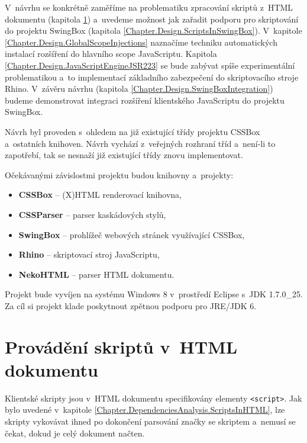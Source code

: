 V~návrhu se konkrétně zaměříme na problematiku zpracování skriptů z~HTML dokumentu (kapitola \ref{Chapter.Design.ScriptsInHTML}) a~uvedeme možnost jak zařadit podporu pro skriptování do projektu SwingBox (kapitola \ref{Chapter.Design.ScriptsInSwingBox}). V~kapitole \ref{Chapter.Design.GlobalScopeInjections} naznačíme techniku automatických instalací rozšíření do hlavního scope  JavaScriptu. Kapitola \ref{Chapter.Design.JavaScriptEngineJSR223} se bude zabývat spíše experimentální problematikou a~to implementací základního zabezpečení do skriptovacího stroje Rhino. V~závěru návrhu (kapitola \ref{Chapter.Design.SwingBoxIntegration}) budeme demonstrovat integraci rozšíření klientského JavaScriptu do projektu SwingBox.

Návrh byl proveden s~ohledem na již existující třídy projektu CSSBox a~ostatních knihoven. Návrh vychází z~veřejných rozhraní tříd a~není-li to zapotřebí, tak se nesnaží již existující třídy znovu implementovat. 

\bigskip \noindent Očekávanými závislostmi projektu budou knihovny a~projekty:

\begin{itemize}
  \item \textbf{CSSBox} \cite{Bibliography.CSSBox} -- (X)HTML renderovací knihovna,
  \item \textbf{CSSParser} \cite{Bibliography.jStyleParser} -- parser kaskádových stylů,
  \item \textbf{SwingBox} \cite{Bibliography.SwingBox} -- prohlížeč webových stránek využívající CSSBox,
  \item \textbf{Rhino} \cite{Bibliography.Rhino.Docs} -- skriptovací stroj JavaScriptu,
  \item \textbf{NekoHTML} \cite{Bibliography.NekoHTML} -- parser HTML dokumentu.
\end{itemize}

Projekt bude vyvíjen na systému Windows 8 v~prostředí Eclipse s~JDK 1.7.0\_25. Za cíl si projekt klade poskytnout zpětnou podporu pro JRE/JDK 6.
 
\section{Provádění skriptů v~HTML dokumentu}
\label{Chapter.Design.ScriptsInHTML}

Klientské skripty jsou v~HTML dokumentu specifikovány elementy \texttt{<script>}. Jak bylo uvedené v~kapitole \ref{Chapter.DependenciesAnalysis.ScriptsInHTML}, lze skripty vykovávat ihned po dokončení parsování značky se skriptem a~nemusí se čekat, dokud je celý dokument načten. 

